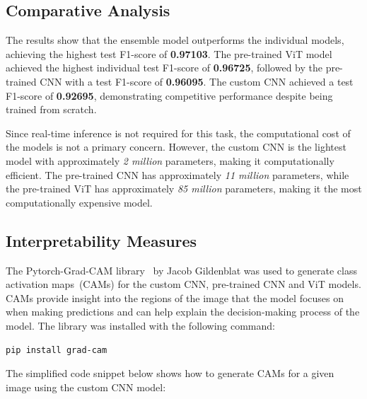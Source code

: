 \subsection{Comparative Analysis}%

The results show that the ensemble model outperforms the individual models, achieving the highest test F1-score of \textbf{0.97103}. The pre-trained ViT model achieved the highest individual test F1-score of \textbf{0.96725}, followed by the pre-trained CNN with a test F1-score of \textbf{0.96095}. The custom CNN achieved a test F1-score of \textbf{0.92695}, demonstrating competitive performance despite being trained from scratch.

Since real-time inference is not required for this task, the computational cost of the models is not a primary concern. However, the custom CNN is the lightest model with approximately \textit{2 million} parameters, making it computationally efficient. The pre-trained CNN has approximately \textit{11 million} parameters, while the pre-trained ViT has approximately \textit{85 million} parameters, making it the most computationally expensive model.

\subsection{Interpretability Measures}

The Pytorch-Grad-CAM library~\cite{jacobgilpytorchcam} by Jacob Gildenblat was used to generate class activation maps~(CAMs) for the custom CNN, pre-trained CNN and ViT models. CAMs provide insight into the regions of the image that the model focuses on when making predictions and can help explain the decision-making process of the model. The library was installed with the following command:

\begin{minipage}{0.9\linewidth}\begin{lstlisting}[language={},caption={Install Pytorch-Grad-CAM library.},label={lst:install-grad-cam}]
pip install grad-cam
\end{lstlisting}\end{minipage}

The simplified code snippet below shows how to generate CAMs for a given image using the custom CNN model:


